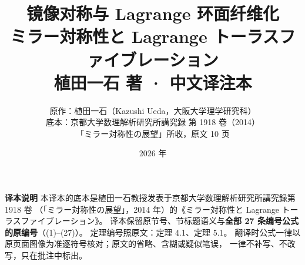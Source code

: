 

\title{\bfseries 镜像对称与 Lagrange 环面纤维化\\[6pt]
  \large\mdseries ミラー対称性と Lagrange トーラスファイブレーション\\[2pt]
  \large\mdseries 植田一石 著 · 中文译注本}
\author{原作：植田一石（Kazushi Ueda，大阪大学理学研究科）\\[2pt]
  \small 底本：京都大学数理解析研究所講究録 第 1918 卷（2014）\\
  \small 「ミラー対称性の展望」所收，原文 10 页}
\date{2026 年}


\maketitle
\thispagestyle{empty}

\vspace{1em}
\begin{center}
\begin{minipage}{0.86\textwidth}
\small
\textbf{译本说明}\quad
本译本的底本是植田一石教授发表于京都大学数理解析研究所講究録第 1918 卷
（「ミラー対称性の展望」，2014 年）的《ミラー対称性と Lagrange トーラスファイブレーション》。
译本保留原节号、节标题语义与\textbf{全部 27 条编号公式的原编号}（(1)–(27)）。
定理编号照原文：定理 4.1、定理 5.1。
翻译时公式一律以原页面图像为准逐符号核对；原文的省略、含糊或疑似笔误，
一律不补写、不改写，只在批注中标出。
\end{minipage}
\end{center}

\vspace{0.5em}
\clearpage
\tableofcontents
\clearpage



